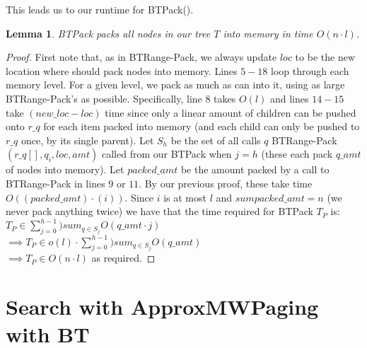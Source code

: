 \documentclass[letterpaper,12pt,titlepage,oneside,final]{book}
\theoremstyle{plain}
\newtheorem{lem}[thm]{Lemma}
\begin{document}
This leads us to our runtime for BT\textendash Pack(). 

\begin{lem}
BT\textendash Pack packs all nodes in our tree $T$ into memory in time $O(n\cdot l)$.
\end{lem}

\begin{proof}

First note that, as in BT\textendash Range-Pack, we always update $loc$ to be the new location where should pack nodes into memory. Lines $5-18$ loop through each memory level. For a given level, we pack as much as can into it, using as large BT\textendash Range-Pack's as possible. Specifically, line $8$ takes $O(l)$ and lines $14-15$ take $(new\_loc - loc)$ time since only a linear amount of children can be pushed onto $r\_q$ for each item packed into memory (and each child can only be pushed to $r\_q$ once, by its single parent). Let $S_h$ be the set of all calls $q$ BT\textendash Range-Pack$(r\_q[], q_i, loc, amt)$ called from our BT\textendash Pack when $j = h$ (these each pack $q\_amt$ of nodes into memory). Let $packed\_amt$ be the amount packed by a call to BT\textendash Range-Pack in lines $9$ or $11$. By our previous proof, these take time $O((packed\_amt)\cdot (i))$. Since $i$ is at most $l$ and $sum packed\_amt = n$ (we never pack anything twice) we have that the time required for BT\textendash Pack $T_P$ is: \\
$T_{P} \in \sum_{j=0}^{h-1})sum_{q \in S_j} O(q\_amt\cdot j)$ \\
$\implies T_{P} \in o(l) \cdot  \sum_{j=0}^{h-1})sum_{q \in S_j} O(q\_amt)$ \\
$\implies T_{P} \in O(n\cdot l)$ as required.

\end{proof}


\section{Search with ApproxMWPaging with BT}
\end{document}

